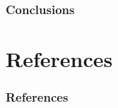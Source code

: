 \documentclass{beamer}
\newcommand{\linespace}{\vskip 0.25cm}
\begin{document}
\begin{frame}
\frametitle{Conclusions}
%
%
%  
%  
%
%  
%
%
%
%	
%		
%	
%	
%	
\end{frame}

\section*{References}

\begin{frame} 
	\frametitle{References} 
%	
%	
%	
%  
%	
\end{frame} 
\end{document}

